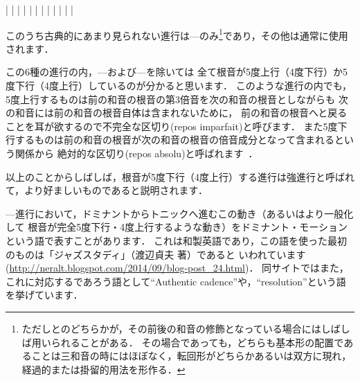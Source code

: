 \documentclass[dvipdfmx,uplatex,b5paper,openany,jbase=12Q,nomag*,textwidth-limit=44%
               ]{gachimuchi}
\begin{document}
\begin{Music}
  \Startpiece
  \NOTes%
  |%
  \en%
  \NOTes%
  |%
  \en\doublebar%
  \NOTes%
  |%
  \en%
  \NOTes%
  |%
  \en\doublebar%
  \NOTes%
  |%
  \en%
  \NOTes%
  |%
  \en\doublebar%
  \NOTes%
  |%
  \en%
  \NOTes%
  |%
  \en\doublebar%
  \NOTes%
  |%
  \en%
  \NOTes%
  |%
  \en\doublebar%
  \NOTes%
  |%
  \en%
  \NOTes%
  |%
  \en\setdoublebar%
  \endpiece
\end{Music}


このうち古典的にあまり見られない進行は---のみ\footnote{%
  ただしとのどちらかが，その前後の和音の修飾となっている場合にはしばしば用いられることがある．
  その場合であっても，どちらも基本形の配置であることは三和音の時にはほぼなく，転回形がどちらかあるいは双方に現れ，
  経過的または掛留的用法を形作る．
}であり，その他は通常に使用されます．
\begin{Yodan}
この6種の進行の内，---および---を除いては
全て根音が5度上行（4度下行）か5度下行（4度上行）しているのが分かると思います．
このような進行の内でも，5度上行するものは前の和音の根音の第3倍音を次の和音の根音としながらも
次の和音には前の和音の根音自体は含まれないために，
前の和音の根音へと戻ることを耳が欲するので不完全な区切り(repos imparfait)と呼びます．
また5度下行するものは前の和音の根音が次の和音の根音の倍音成分となって含まれるという関係から
絶対的な区切り(repos absolu)と呼ばれます~\cite{chRAMEAU1}．

以上のことからしばしば，根音が5度下行（4度上行）する進行は強進行と呼ばれて，より好ましいものであると説明されます．
\end{Yodan}
\begin{Yodan}
  ---進行において，ドミナントからトニックへ進むこの動き（あるいはより一般化して
  根音が完全5度下行・4度上行するような動き）をドミナント・モーションという語で表すことがあります．
  これは和製英語であり，この語を使った最初のものは「ジャズスタディ」（渡辺貞夫 著）であると
  いわれています(\url{http://neralt.blogspot.com/2014/09/blog-post_24.html})．
  同サイトではまた，これに対応するであろう語として``Authentic cadence''や，``resolution''という語を挙げています．
\end{Yodan}
\end{document}
